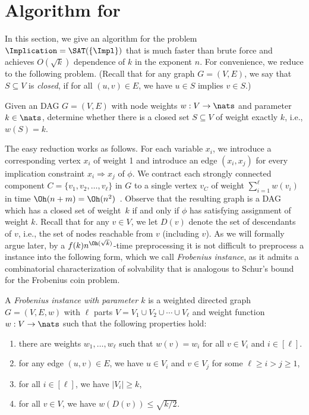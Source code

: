 \setcounter{section}{2}
\section{Algorithm for \Implication}
\label{sec:implalgo}
%
In this section, we give an algorithm for the problem $\Implication = \SAT(\{\Impl\})$ that is much faster than brute force and achieves $O(\sqrt{k})$ dependence of $k$ in the exponent $n$. 
For convenience, we reduce \Implication to the following problem. (Recall that for any graph $G=(V,E)$, we say that $S\subseteq V$ is \emph{closed}, if for all $(u,v)\in E$, we have $u \in S$ implies $v\in S$.)
%
\begin{problem}[\wDAGImplication]
Given an DAG $G=(V,E)$ with node weights $w: V\to \nats$ and parameter $k\in \nats$, determine whether there is a closed set $S \subseteq V$ of weight exactly $k$, i.e., $w(S) = k$.
\end{problem}
The easy reduction works as follows. For each variable $x_i$, we introduce a corresponding vertex $x_i$ of weight 1 and introduce an edge $(x_i, x_j)$ for every implication constraint $x_i \Rightarrow x_j$ of $\phi$. We contract each strongly connected component $C=\{v_1, v_2, \dots, v_\ell\}$ in $G$ to a single vertex $v_C$ of weight $\sum_{i=1}^\ell w(v_i)$ in time $\Oh(n+m)= \Oh(n^2)$~\cite{Tarjan72}. Observe that the resulting graph is a DAG which has a closed set of weight~$k$ if and only if $\phi$ has satisfying assignment of weight $k$.
%
Recall that for any $v\in V$, we let $D(v)$ denote the set of descendants of $v$, i.e., the set of nodes reachable from $v$ (including $v$).
%
As we will formally argue later, by a $f(k)n^{\Oh(\sqrt{k})}$-time preprocessing it is not difficult to preprocess a \wDAGImplication instance into the following form, which we call \emph{Frobenius instance}, as it admits a combinatorial characterization of solvability that is analogous to Schur's bound for the Frobenius coin problem.
%
\begin{defn}
A \emph{Frobenius instance with parameter $k$} is a weighted directed graph $G = (V,E, w)$ with $\ell$ parts $V = V_1 \cup V_2 \cup \cdots \cup V_\ell$ and weight function $w:V \to \nats$ such that the following properties hold: 
\begin{enumerate}[label=(P\arabic*)]
\item\label{item:structweights} there are weights $w_1, \dots, w_\ell$ such that $w(v) = w_i$ for all $v\in V_i$ and $i \in [\ell]$.
\item\label{item:structedges} for any edge $(u,v)\in E$, we have $u\in V_i$ and $v\in V_j$ for some $\ell \ge i > j \ge 1$,
\item\label{item:size} for all $i\in [\ell]$, we have $|V_i| \ge k$, 
\item\label{item:weights} for all $v\in V$, we have $w(D(v)) \le \sqrt{k/2}$.
\end{enumerate}
\end{defn}
